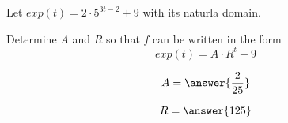 \documentclass{ximera}
\author{Lee Wayand}
\begin{document}
\begin{exercise}




Let $exp(t) = 2 \cdot 5^{3t-2} + 9$ with its naturla domain.


\begin{question}


Determine $A$ and $R$ so that $f$ can be written in the form 
\[
exp(t) = A \cdot R^t + 9
\]



\[
A = \answer{\frac{2}{25}}
\]


\[
R = \answer{125}
\]


\end{question}















\end{exercise}
\end{document}
